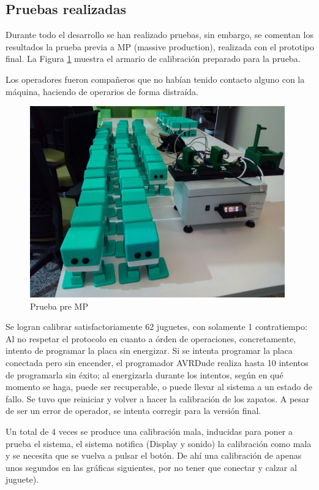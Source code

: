 
\subsection{Pruebas realizadas}


Durante todo el desarrollo se han realizado pruebas, sin embargo, se comentan los resultados la prueba previa a MP (massive production), realizada con el prototipo final. La Figura \ref{fig:pre-mp} muestra el armario de calibración preparado para la prueba.

Los operadores fueron compañeros que no habían tenido contacto alguno con la máquina, haciendo de operarios de forma distraída.
\begin{figure}
\centering
\includegraphics[width=110mm]{Figures/pre-mp}
\caption{Prueba pre MP}
\label{fig:pre-mp}
\end{figure}

Se logran calibrar satisfactoriamente 62 juguetes, con solamente 1 contratiempo: Al no respetar el protocolo en cuanto a órden de operaciones, concretamente, intento de programar la placa sin energizar. Si se intenta programar la placa conectada pero sin encender, el programador AVRDude realiza hasta 10 intentos de programarla sin éxito; al energizarla durante los intentos, según en qué momento se haga, puede ser recuperable, o puede llevar al sistema a un estado de fallo. Se tuvo que reiniciar y volver a hacer la calibración de los zapatos. A pesar de ser un error de operador, se intenta corregir para la versión final.

Un total de 4 veces se produce una calibración mala, inducidas para poner a prueba el sistema, el sistema notifica (Display y sonido) la calibración como mala y se necesita que se vuelva a pulsar el botón. De ahí una calibración de apenas unos segundos en las gráficas siguientes, por no tener que conectar y calzar al juguete).

